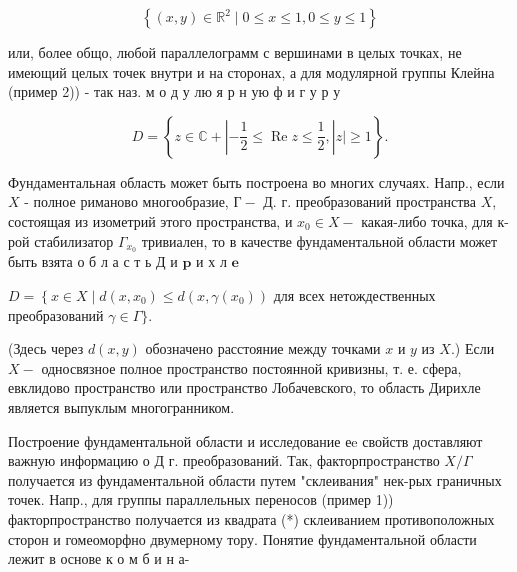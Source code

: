 \documentclass[10pt]{article}
\begin{document}
\[

\left\{(x, y) \in \mathbb{R}^{2} \mid 0 \leqslant x \leqslant 1,0 \leqslant y \leqslant 1\right\}

\]



или, более общо, любой параллелограмм с вершинами в целых точках, не имеющий целых точек внутри и на сторонах, а для модулярной группы Клейна (пример 2)) - так наз. м о д у лю я р н ую ф и г у р у



\[

D=\left\{z \in \mathbb{C}+\left|-\frac{1}{2} \leqslant \operatorname{Re} z \leqslant \frac{1}{2},\right| z \mid \geqslant 1\right\} .

\]



Фундаментальная область может быть построена во многих случаях. Напр., если $X$ - полное риманово многообразие, $Г-$ Д. г. преобразований пространства $X$, состоящая из изометрий этого пространства, и $x_{0} \in X-$ какая-либо точка, для к-рой стабилизатор $\Gamma_{x_{0}}$ тривиален, то в качестве фундаментальной области может быть взята о б л а с т ь Д и $\mathbf{p}$ и х л $\mathbf{e}$



$D=\left\{x \in X \mid d\left(x, x_{0}\right) \leqslant d\left(x, \gamma\left(x_{0}\right)\right)\right.$ для всех нетождественных преобразований $\gamma \in \Gamma\}$.



(Здесь через $d(x, y)$ обозначено расстояние между точками $x$ и $y$ из $X$.) Если $X-$ односвязное полное пространство постоянной кривизны, т. е. сфера, евклидово пространство или пространство Лобачевского, то область Дирихле является выпуклым многогранником.



Построение фундаментальной области и исследование еe свойств доставляют важную информацию о Д г. преобразований. Так, факторпространство $X / \Gamma$ получается из фундаментальной области путем "склеивания" нек-рых граничных точек. Напр., для группы параллельных переносов (пример 1)) факторпространство получается из квадрата (*) склеиванием противоположных сторон и гомеоморфно двумерному тору. Понятие фундаментальной области лежит в основе к о м б и н а-
\end{document}
